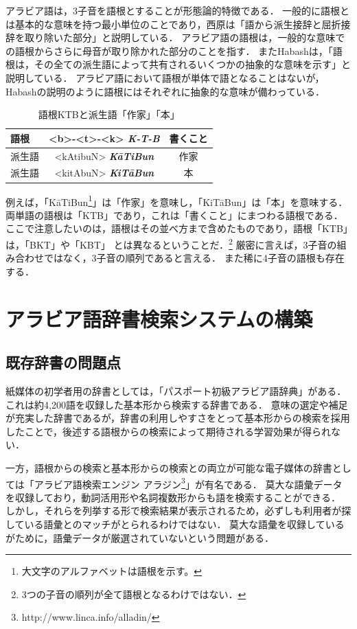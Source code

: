 \documentclass[technicalreport]{ieicej}
\begin{document}
アラビア語は，3子音を語根とすることが形態論的特徴である．
一般的に語根とは基本的な意味を持つ最小単位のことであり，西原\cite{nishihara2012}は「語から派生接辞と屈折接辞を取り除いた部分」と説明している．
アラビア語の語根は，一般的な意味での語根からさらに母音が取り除かれた部分のことを指す．
またHabash\cite{habash2010}は，「語根は，その全ての派生語によって共有されるいくつかの抽象的な意味を示す」と説明している．
アラビア語において語根が単体で語となることはないが，Habashの説明のように語根にはそれぞれに抽象的な意味が備わっている．

\begin{table}[ht]
\begin{center}
\begin{tabular}{l|cc}
   語根& <b>-<t>-<k> \textit{\textbf{K-T-B}} & 書くこと\\
  \hline
 派生語& <kAtibuN>  \textit{\textbf{K\=aTiBun}}& 作家\\
  派生語& <kitAbuN>  \textit{\textbf{KiT\=aBun}}& 本\\
\hline
\end{tabular}
\caption{語根KTBと派生語「作家」「本」}
\label{table:alignment}
\end{center}
\end{table}

例えば，「K\=aTiBun\footnote{大文字のアルファベットは語根を示す。}」は「作家」を意味し，「KiT\=aBun」は「本」を意味する．
両単語の語根は「KTB」であり，これは「書くこと」にまつわる語根である．
ここで注意したいのは，語根はその並べ方まで含めたものであり，語根「KTB」は，「BKT」や「KBT」 とは異なるということだ．\footnote{3つの子音の順列が全て語根となるわけではない．}
厳密に言えば，3子音の組み合わせではなく，3子音の順列であると言える．
また稀に4子音の語根も存在する．

\section{アラビア語辞書検索システムの構築}
\subsection{既存辞書の問題点}
紙媒体の初学者用の辞書としては，「パスポート初級アラビア語辞典」がある．
これは約4,200語を収録した基本形から検索する辞書である．
意味の選定や補足が充実した辞書であるが，辞書の利用しやすさをとって基本形からの検索を採用したことで，後述する語根からの検索によって期待される学習効果が得られない．

一方，語根からの検索と基本形からの検索との両立が可能な電子媒体の辞書としては「アラビア語検索エンジン アラジン\footnote{http://www.linca.info/alladin/}」が有名である．
莫大な語彙データを収録しており，動詞活用形や名詞複数形からも語を検索することができる．
しかし，それらを列挙する形で検索結果が表示されるため，必ずしも利用者が探している語彙とのマッチがとられるわけではない．
莫大な語彙を収録しているがために，語彙データが厳選されていないという問題がある．
\end{document}
